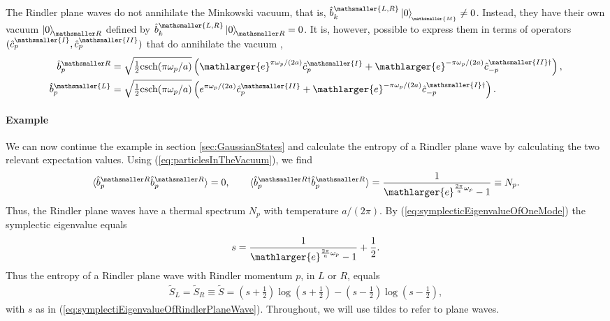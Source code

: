 \documentclass[11pt, a4paper]{article}
\newcommand{\om}{\omega}
\newcommand{\sfrac}[2]{{\textstyle\frac{#1}{#2}}}
\newcommand{\half}{\sfrac{1}{2}}
\newcommand{\ket}[1]{\left| #1 \right>} %
\newcommand{\csch}{\mathrm{csch}}
\newcommand{\e}{\mathlarger{e}}
\newcommand{\ms}{\mathsmaller}
\newcommand{\nodagger}{{\phantom{\dagger}}}
\newcommand{\mink}{{\,_{\!\!\ms{M}}}}
\begin{document}
The Rindler plane waves do not annihilate the Minkowski vacuum, that is, $\hat b^{\ms{L,R}}_k\ket{0}_\mink \neq 0$. Instead, they have their own vacuum $\ket{0}_{\! \ms R}$ defined by $\hat b^{\ms{L,R}}_k\ket{0}_{\!\ms R}=0$. It is, however, possible to express them  in terms of operators $(\hat c_p^\ms{I},\hat c_p^\ms{II})$ that do annihilate the vacuum \cite{Carroll},
\begin{equation}
\begin{aligned}
	\hat b^{\ms R}_p&=\sqrt{\half \csch(\pi \om_p / a)}\left(\e^{\pi\om_p/(2a)}\hat c_p^{\ms{I}}+\e^{-\pi\om_p/(2a)}\hat c^{\ms{II}\dagger}_{-p}\right),\\
	\hat b^{\ms{L}}_p&=\sqrt{\half \csch(\pi \om_p / a)}\left(e^{\pi\om_p/(2a)}\hat c^{\ms{II}}_p+\e^{-\pi\om_p/(2a)}\hat c^{\ms{I}\dagger}_{-p}\right).
    \end{aligned}
\end{equation}

\paragraph{Example}
We can now continue the example in section \ref{sec:GaussianStates} and calculate the entropy of a Rindler plane wave by calculating the two relevant expectation values. Using (\ref{eq:particlesInTheVacuum}), we find
\begin{align}
\label{eq:thermalSpectrum}
\langle \hat b^{\ms R}_p\hat b^{\ms R}_p\rangle =0,\qquad
\langle \hat b_p^{\ms R \dagger}\hat b^{\ms R\nodagger}_p\!\!\rangle  =\frac{1}{\e^{\frac{2\pi}{a} \om_p }-1}\equiv N_p.
\end{align}
Thus, the Rindler plane waves have a thermal spectrum $N_p$ with temperature $a/(2\pi)$. By (\ref{eq:symplecticEigenvalueOfOneMode}) the symplectic eigenvalue equals
\begin{align}
\label{eq:symplectiEigenvalueOfRindlerPlaneWave}
s=\frac{1}{\e^{\frac{2\pi}{a} \om_p }-1}+\frac{1}{2}.
\end{align}
Thus the entropy of a Rindler plane wave with Rindler momentum $p$, in $L$ or $R$, equals
\begin{align}
\label{eq:entropyOfRindlerPlaneWave}
\widetilde S_L=\widetilde S_R\equiv \widetilde S=\left(s+\half\right)\log\left(s+\half\right)-\left(s-\half\right)\log\left(s-\half\right),
\end{align}
with $s$ as in (\ref{eq:symplectiEigenvalueOfRindlerPlaneWave}).  Throughout, we will use tildes to refer to plane waves. 
\end{document}
